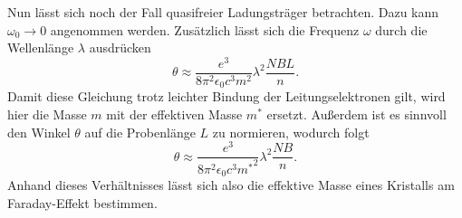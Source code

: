 Nun lässt sich noch der Fall quasifreier Ladungsträger betrachten. Dazu kann $\omega_0 \to 0$ angenommen werden. Zusätzlich lässt sich die Frequenz $\omega$ durch die Wellenlänge $\lambda$ ausdrücken
\begin{equation*}
    \theta \approx \frac{e^3}{8 \pi^2 \epsilon_0 c^3 m^2} \lambda^2 \frac{NBL}{n}.
\end{equation*}
Damit diese Gleichung trotz leichter Bindung der Leitungselektronen gilt, wird hier die Masse $m$ mit der effektiven Masse $m^*$ ersetzt. Außerdem ist es sinnvoll
den Winkel $\theta$ auf die Probenlänge $L$ zu normieren, wodurch folgt
\begin{equation}
    \label{eqn:wichtig}
    \theta \approx \frac{e^3}{8 \pi^2 \epsilon_0 c^3 {m^*}^2} \lambda^2 \frac{NB}{n}.
\end{equation}
Anhand dieses Verhältnisses lässt sich also die effektive Masse eines Kristalls am Faraday-Effekt bestimmen.